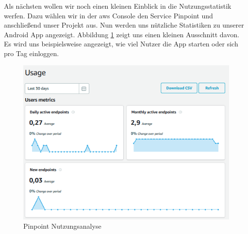 Als nächsten wollen wir noch einen kleinen Einblick in die Nutzungsstatistik werfen. Dazu wählen wir in der \gls{aws} Console den Service Pinpoint und anschließend unser Projekt aus. Nun werden uns nützliche Statistiken zu unserer Android App angezeigt. Abbildung \ref{fig:pinpointanalystics} zeigt uns einen kleinen Ausschnitt davon. Es wird uns beispielsweise angezeigt, wie viel Nutzer die App starten oder sich pro Tag einloggen.

\begin{figure}[h!]
	\centering
	\includegraphics[width=1\linewidth]{Pictures/PinpointAnalystics}
	\caption[Pinpoint Nutzungsanalyse]{Pinpoint Nutzungsanalyse}
	\label{fig:pinpointanalystics}
\end{figure}
